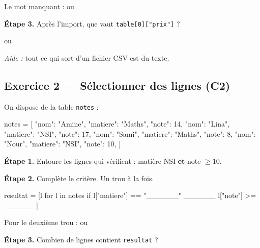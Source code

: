 \medskip
Le mot manquant :  \qquad ou \qquad {}

\bigskip

\textbf{Étape 3.} Après l'import, que vaut \lstinline{table[0]["prix"]} ?

\medskip
\begin{center}
 \qquad ou \qquad {}
\end{center}

\medskip
\textit{Aide :} tout ce qui sort d'un fichier CSV est du texte.

\bigskip
\bigskip

\subsection*{Exercice 2 --- Sélectionner des lignes (C2)}

On dispose de la table \texttt{notes} :

\begin{python}
notes = [
    {"nom": "Amine", "matiere": "Maths", "note": 14},
    {"nom": "Lina",  "matiere": "NSI",   "note": 17},
    {"nom": "Sami",  "matiere": "Maths", "note": 8},
    {"nom": "Nour",  "matiere": "NSI",   "note": 10},
]
\end{python}

\bigskip

\textbf{Étape 1.} Entoure les lignes qui vérifient : matière NSI \textbf{et} note $\geqslant 10$.

\medskip
\begin{center}
 \qquad {} \qquad {} \qquad {}
\end{center}

\bigskip

\textbf{Étape 2.} Complète le critère. Un trou à la fois.

\begin{python}
resultat = [l for l in notes
            if l["matiere"] == "______" ______ l["note"] >= ______]
\end{python}

\medskip
Pour le deuxième trou :  \qquad ou \qquad {}

\bigskip

\textbf{Étape 3.} Combien de lignes contient \texttt{resultat} ?

\medskip
\dotfill

\bigskip
\bigskip

